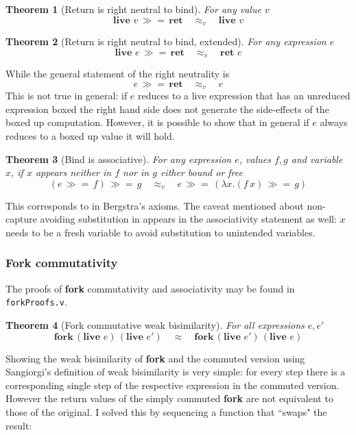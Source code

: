 \documentclass[12pt,twoside,notitlepage]{report}
\theoremstyle{plain}%
\newtheorem{thm}{Theorem}[section]
\theoremstyle{definition}
\theoremstyle{remark}
\begin{document}
\begin{thm}[Return is right neutral to bind]
For any value $ v$
\[  \textbf{live }v\,\gg=\, \textbf{ret}\quad \approx_v \quad \textbf{live }v \]
\end{thm}

\begin{thm}[Return is right neutral to bind, extended]
For any expression $ e$
\[  \textbf{live }e\,\gg=\, \textbf{ret}\quad \approx_v \quad \textbf{ret } e \]
\end{thm}

While the general statement of the right neutrality is 
\[  e\,\gg=\, \textbf{ret}\quad \approx_v \quad e \]
This is not true in general: if $ e $ reduces to a live expression that has an unreduced expression boxed the right hand side does not generate the side-effects of the boxed up computation. However, it is possible to show that in general if $ e $ always reduces to a boxed up value it will hold.

\begin{thm}[Bind is associative]
For any expression $ e $, values $ f, g $ and variable $ x $, if $ x $ appears neither in $ f $ nor in $ g $ either bound or free
\[ (e\, \gg=\, f) \, \gg=\, g \quad \approx_v \quad e\, \gg=\, (\lambda x. (f\, x) \, \gg=\, g ) \]
\end{thm}

This corresponds to  in Bergstra's axioms. The caveat mentioned about non-capture avoiding substitution in  appears in the associativity statement as well: $ x $ needs to be a fresh variable to avoid substitution to unintended variables.

\subsubsection{Fork commutativity}
The proofs of \textbf{fork} commutativity and associativity may be found in \verb|forkProofs.v|.

\begin{thm}[Fork commutative weak bisimilarity]
For all expressions $ e, e'$
\[  \textbf{fork}\,(\textbf{live }e)\,(\textbf{live }e')\quad \approx \quad \textbf{fork}\,(\textbf{live }e')\,(\textbf{live }e) \]
\end{thm}

Showing the weak bisimilarity of \textbf{fork} and the commuted version using Sangiorgi's definition of weak bisimilarity is very simple: for every step there is a corresponding single step of the respective expression in the commuted version. However the return values of the simply commuted \textbf{fork} are not equivalent to those of the original. I solved this by sequencing a function that ``swaps" the result:
\end{document}
